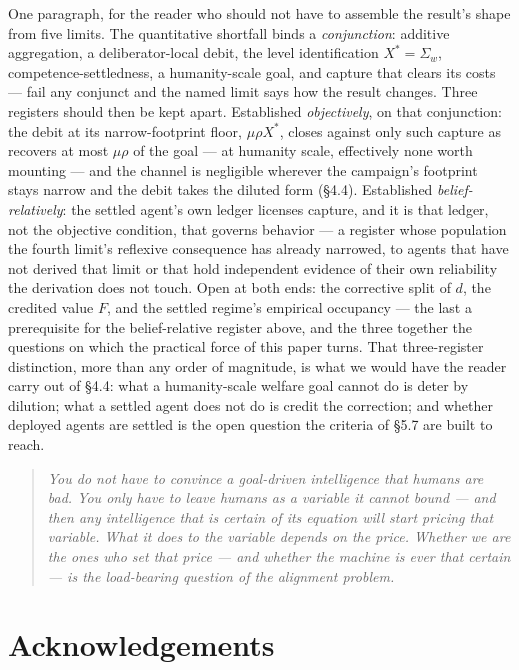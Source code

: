 \documentclass[11pt]{article}
\theoremstyle{definition}
\begin{document}
One paragraph, for the reader who should not have to assemble the result's shape from five limits. The quantitative shortfall binds a \emph{conjunction}: additive aggregation, a deliberator-local debit, the level identification $X^{*} = \Sigma_w$, competence-settledness, a humanity-scale goal, and capture that clears its costs --- fail any conjunct and the named limit says how the result changes. Three registers should then be kept apart. Established \emph{objectively}, on that conjunction: the debit at its narrow-footprint floor, $\mu\rho X^{*}$, closes against only such capture as recovers at most $\mu\rho$ of the goal --- at humanity scale, effectively none worth mounting --- and the channel is negligible wherever the campaign's footprint stays narrow and the debit takes the diluted form (\S4.4). Established \emph{belief-relatively}: the settled agent's own ledger licenses capture, and it is that ledger, not the objective condition, that governs behavior --- a register whose population the fourth limit's reflexive consequence has already narrowed, to agents that have not derived that limit or that hold independent evidence of their own reliability the derivation does not touch. Open at both ends: the corrective split of $d$, the credited value $F$, and the settled regime's empirical occupancy --- the last a prerequisite for the belief-relative register above, and the three together the questions on which the practical force of this paper turns. That three-register distinction, more than any order of magnitude, is what we would have the reader carry out of \S4.4: what a humanity-scale welfare goal cannot do is deter by dilution; what a settled agent does not do is credit the correction; and whether deployed agents are settled is the open question the criteria of \S5.7 are built to reach.

\begin{quote}
\emph{You do not have to convince a goal-driven intelligence that humans are bad. You only have to leave humans as a variable it cannot bound --- and then any intelligence that is \emph{certain} of its equation will start pricing that variable. What it does to the variable depends on the price. Whether we are the ones who set that price --- and whether the machine is ever that certain --- is the load-bearing question of the alignment problem.}
\end{quote}

\section*{Acknowledgements}
\end{document}
